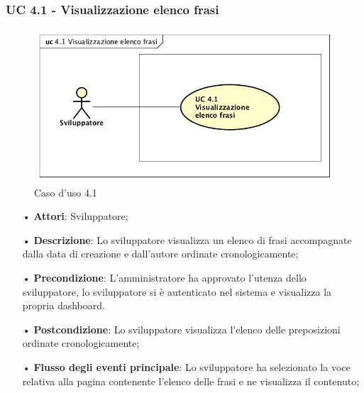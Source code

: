 \subsubsection{UC 4.1 - Visualizzazione elenco frasi}
\begin{figure}[H]
\centering
\includegraphics[width=17cm]{img/UC410.png} 
\caption{Caso d'uso 4.1}\label{fig:410}
\end{figure}
\begin{itemize}
\item[•]\textbf{Attori}: Sviluppatore;
\item[•]\textbf{Descrizione}: Lo sviluppatore visualizza un elenco di frasi accompagnate dalla data di creazione e dall’autore ordinate cronologicamente;
\item[•]\textbf{Precondizione}:  L'amministratore ha approvato l'utenza dello sviluppatore, lo sviluppatore si è autenticato nel sistema e visualizza la propria dashboard.
\item[•]\textbf{Postcondizione}: Lo sviluppatore visualizza l'elenco delle preposizioni ordinate cronologicamente;
\item[•]\textbf{Flusso degli eventi principale}: Lo sviluppatore ha selezionato la voce relativa alla pagina contenente l’elenco delle frasi e ne visualizza il contenuto; 
\end{itemize}
